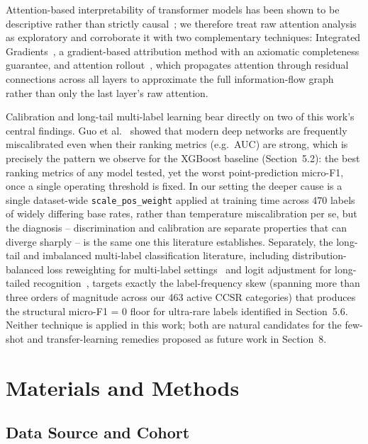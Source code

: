 \documentclass[11pt]{article}
\begin{document}
Attention-based interpretability of transformer models has been shown to be
descriptive rather than strictly causal~\cite{jain2019attention}; we therefore
treat raw attention analysis as exploratory and corroborate it with two
complementary techniques: Integrated
Gradients~\cite{sundararajan2017axiomatic}, a gradient-based attribution
method with an axiomatic completeness guarantee, and attention
rollout~\cite{abnar2020quantifying}, which propagates attention through
residual connections across all layers to approximate the full
information-flow graph rather than only the last layer's raw attention.

Calibration and long-tail multi-label learning bear directly on two of this
work's central findings. Guo et al.~\cite{guo2017calibration} showed that
modern deep networks are frequently miscalibrated even when their ranking
metrics (e.g.\ AUC) are strong, which is precisely the pattern we observe for
the XGBoost baseline (Section~5.2): the best ranking metrics of any model
tested, yet the worst point-prediction micro-F1, once a single operating
threshold is fixed. In our setting the deeper cause is a single
dataset-wide \texttt{scale\_pos\_weight} applied at training time across 470
labels of widely differing base rates, rather than temperature miscalibration
per se, but the diagnosis -- discrimination and calibration are separate
properties that can diverge sharply -- is the same one this literature
establishes. Separately, the long-tail and imbalanced multi-label
classification literature, including distribution-balanced loss reweighting
for multi-label settings~\cite{wu2020distributionbalanced} and logit
adjustment for long-tailed recognition~\cite{menon2021logitadjustment},
targets exactly the label-frequency skew (spanning more than three orders of
magnitude across our 463 active CCSR categories) that produces the structural
micro-F1 = 0 floor for ultra-rare labels identified in Section~5.6. Neither
technique is applied in this work; both are natural candidates for the
few-shot and transfer-learning remedies proposed as future work in Section~8.

\section{Materials and Methods}

\subsection{Data Source and Cohort}
\end{document}
